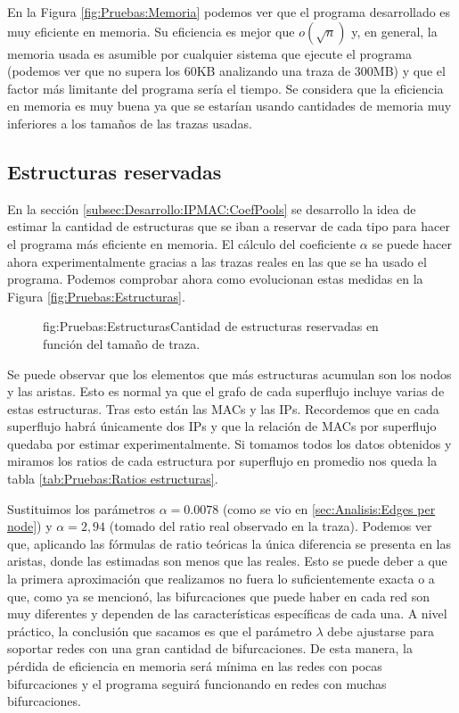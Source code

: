 \documentclass[tfg,epsbased,lof,lot,loa,final,nocopyright,overleaf]{tfgtfmthesisuam}
\begin{document}
En la Figura \ref{fig:Pruebas:Memoria} podemos ver que el programa desarrollado es muy eficiente en memoria. Su eficiencia es mejor que $o(\sqrt{n})$ y, en general, la memoria usada es asumible por cualquier sistema que ejecute el programa (podemos ver que no supera los 60KB analizando una traza de 300MB) y que el factor más limitante del programa sería el tiempo. Se considera que la eficiencia en memoria es muy buena ya que se estarían usando cantidades de memoria muy inferiores a los tamaños de las trazas usadas. 

\subsection{Estructuras reservadas}
En la sección \ref{subsec:Desarrollo:IPMAC:CoefPools} se desarrollo la idea de estimar la cantidad de estructuras que se iban a reservar de cada tipo para hacer el programa más eficiente en memoria. El cálculo del coeficiente $\alpha$ se puede hacer ahora experimentalmente gracias a las trazas reales en las que se ha usado el programa. Podemos comprobar ahora como evolucionan estas medidas en la Figura \ref{fig:Pruebas:Estructuras}.


\begin{figure}[Gráfica de estructuras utilizadas]{fig:Pruebas:Estructuras}{Cantidad de estructuras reservadas en función del tamaño de traza.}
\end{figure}

Se puede observar que los elementos que más estructuras acumulan son los nodos y las aristas. Esto es normal ya que el grafo de cada superflujo incluye varias de estas estructuras. Tras esto están las MACs y las IPs. Recordemos que en cada superflujo habrá únicamente dos IPs y que la relación de MACs por superflujo quedaba por estimar experimentalmente. Si tomamos todos los datos obtenidos y miramos los ratios de cada estructura por superflujo en promedio nos queda la tabla \ref{tab:Pruebas:Ratios estructuras}.

Sustituimos los parámetros $\alpha = 0.0078$ (como se vio en \ref{sec:Analisis:Edges per node}) y $\alpha = 2,94$ (tomado del ratio real observado en la traza). Podemos ver que, aplicando las fórmulas de ratio teóricas la única diferencia se presenta en las aristas, donde las estimadas son menos que las reales. Esto se puede deber a que la primera aproximación que realizamos no fuera lo suficientemente exacta o a que, como ya se mencionó, las bifurcaciones que puede haber en cada red son muy diferentes y dependen de las características específicas de cada una. A nivel práctico, la conclusión que sacamos es que el parámetro $\lambda$ debe ajustarse para soportar redes con una gran cantidad de bifurcaciones. De esta manera, la pérdida de eficiencia en memoria será mínima en las redes con pocas bifurcaciones y el programa seguirá funcionando en redes con muchas bifurcaciones.
\end{document}

